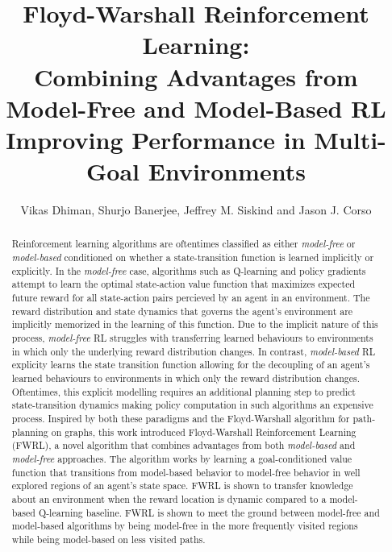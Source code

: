 \documentclass[letterpaper]{article} %
\title{Floyd-Warshall Reinforcement Learning: \\Combining Advantages from
Model-Free and Model-Based RL \\ Improving Performance in Multi-Goal
Environments}
\author{Vikas Dhiman, Shurjo Banerjee, Jeffrey M. Siskind and Jason J.
Corso}
\begin{document}
\maketitle
\begin{abstract}
Reinforcement learning algorithms are oftentimes classified as either
\emph{model-free} or \emph{model-based} conditioned on whether a
state-transition function is learned implicitly or explicitly.  In the
\emph{model-free} case, algorithms such as Q-learning and policy
gradients attempt to learn the optimal state-action value function that
maximizes expected future reward for all state-action pairs percieved by
an agent in an environment.  The reward distribution and state dynamics
that governs the agent's environment are implicitly memorized in the
learning of this function.  Due to the implicit nature of this process,
\emph{model-free} RL struggles with transferring learned behaviours to
environments in which only the underlying reward distribution changes.
In contrast, \emph{model-based} RL explicity learns the state transition
function allowing for the decoupling of an agent's learned behaviours to
environments in which only the reward distribution changes. Oftentimes,
this explicit modelling requires  an additional planning step to predict
state-transition dynamics making policy computation in such algorithms
an expensive process.  Inspired by both these paradigms and the
Floyd-Warshall algorithm for path-planning on graphs,  this work
introduced Floyd-Warshall Reinforcement Learning (FWRL), a novel
algorithm that combines advantages from both \emph{model-based} and
\emph{model-free} approaches.  The algorithm works by learning a
goal-conditioned value function that transitions from model-based
behavior to model-free behavior in well explored regions of an agent's
state space.  FWRL is shown to transfer knowledge about an environment
when the reward location is dynamic compared to a model-based Q-learning
baseline.  FWRL is shown to meet the ground between model-free and
model-based algorithms by being model-free in the more frequently
visited regions while being model-based on less visited paths.


\end{abstract}
\end{document}
